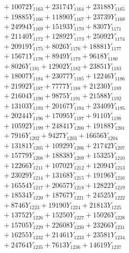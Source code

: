 \documentclass[a4paper,10pt]{article}
\begin{document}
{\begin{align}
&\;  + 10072 Y_{1163} + 23174 Y_{1164} + 23188 Y_{1165} \\[0.3ex]
&\;  + 19885 Y_{1166} + 11890 Y_{1167} + 23739 Y_{1168} \\[0.5ex]\allowbreak
&\;  + 24994 Y_{1169} + 15193 Y_{1170} + 8307 Y_{1171} \\[0.3ex]
&\;  + 21140 Y_{1172} + 12892 Y_{1173} + 25092 Y_{1174} \\[0.3ex]
&\;  + 20919 Y_{1175} + 8026 Y_{1176} + 18881 Y_{1177} \\[0.3ex]
&\;  + 15671 Y_{1178} + 8949 Y_{1179} + 9618 Y_{1180} \\[0.3ex]
&\;  + 8026 Y_{1181} + 12902 Y_{1182} + 23851 Y_{1183} \\[0.3ex]
&\;  + 18007 Y_{1184} + 23077 Y_{1185} + 12246 Y_{1186} \\[0.3ex]
&\;  + 21992 Y_{1187} + 7777 Y_{1188} + 21230 Y_{1189} \\[0.3ex]
&\;  + 21604 Y_{1190} + 9875 Y_{1191} + 21588 Y_{1192} \\[0.3ex]
&\;  + 13103 Y_{1193} + 20167 Y_{1194} + 23409 Y_{1195} \\[0.3ex]
&\;  + 20244 Y_{1196} + 17095 Y_{1197} + 9110 Y_{1198} \\[0.5ex]\allowbreak
&\;  + 10592 Y_{1199} + 24841 Y_{1200} + 19188 Y_{1201} \\[0.3ex]
&\;  + 7916 Y_{1202} + 9427 Y_{1203} + 16656 Y_{1204} \\[0.3ex]
&\;  + 13181 Y_{1205} + 10929 Y_{1206} + 21742 Y_{1207} \\[0.3ex]
&\;  + 15779 Y_{1208} + 18838 Y_{1209} + 15325 Y_{1210} \\[0.3ex]
&\;  + 12266 Y_{1211} + 10702 Y_{1212} + 12094 Y_{1213} \\[0.3ex]
&\;  + 23029 Y_{1214} + 13168 Y_{1215} + 19196 Y_{1216} \\[0.3ex]
&\;  + 16554 Y_{1217} + 20657 Y_{1218} + 12822 Y_{1219} \\[0.3ex]
&\;  + 18534 Y_{1220} + 18767 Y_{1221} + 24525 Y_{1222} \\[0.3ex]
&\;  + 8746 Y_{1223} + 19190 Y_{1224} + 21813 Y_{1225} \\[0.3ex]
&\;  + 13752 Y_{1226} + 15250 Y_{1227} + 15026 Y_{1228} \\[0.5ex]\allowbreak
&\;  + 15705 Y_{1229} + 22608 Y_{1230} + 23266 Y_{1231} \\[0.3ex]
&\;  + 16255 Y_{1232} + 21461 Y_{1233} + 23581 Y_{1234} \\[0.3ex]
&\;  + 24764 Y_{1235} + 7613 Y_{1236} + 14619 Y_{1237} \\[0.3ex]

\end{align}}
\end{document}
